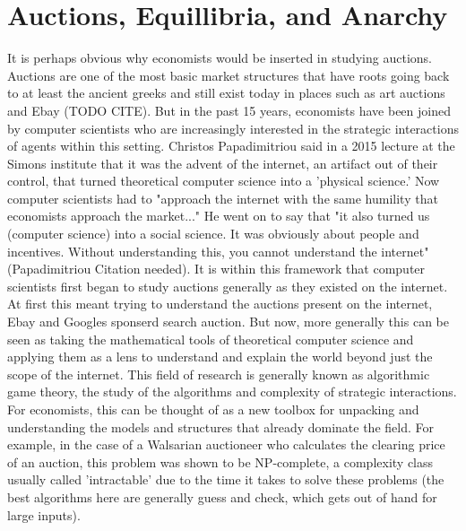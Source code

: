 \documentclass[12pt,twoside]{reedthesis}
\begin{document}
\section{Auctions, Equillibria, and Anarchy}
It is perhaps obvious why economists would be inserted in studying auctions. Auctions are one of the most basic market structures that have roots going back to at least the ancient greeks and still exist today in places such as art auctions and Ebay (TODO CITE). But in the past 15 years, economists have been joined by computer scientists who are increasingly interested in the strategic interactions of agents within this setting. Christos Papadimitriou said in a 2015 lecture at the Simons institute that it was the advent of the internet, an artifact out of their control, that turned theoretical computer science into a 'physical science.' Now computer scientists had to "approach the internet with the same humility that economists approach the market..." He went on to say that "it also turned us (computer science) into a social science. It was obviously about people and incentives. Without understanding this, you cannot understand the internet" (Papadimitriou Citation needed). It is within this framework that computer scientists first began to study auctions generally as they existed on the internet. At first this meant trying to understand the auctions present on the internet, Ebay and Googles sponserd search auction. But now, more generally this can be seen as taking the mathematical tools of theoretical computer science and applying them as a lens to understand and explain the world beyond just the scope of the internet. This field of research is generally known as algorithmic game theory, the study of the algorithms and complexity of strategic interactions. For economists, this can be thought of as a new toolbox for unpacking and understanding the models and structures that already dominate the field. For example, in the case of a Walsarian auctioneer who calculates the clearing price of an auction, this problem was shown to be NP-complete, a complexity class usually called 'intractable' due to the time it takes to solve these problems (the best algorithms here are generally guess and check, which gets out of hand for large inputs). 
\end{document}
